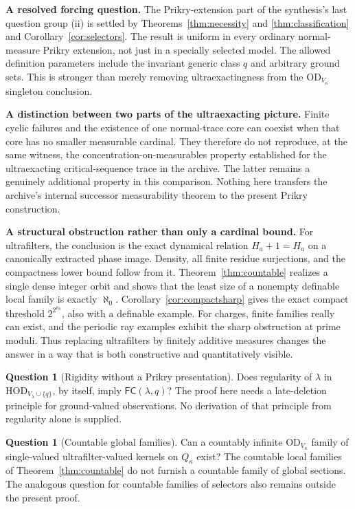 \documentclass[11pt,letterpaper]{article}
\theoremstyle{definition}
\newtheorem{question}[definition]{Question}
\numberwithin{equation}{section}
\newcommand{\HOD}{\mathrm{HOD}}
\newcommand{\OD}{\mathrm{OD}}
\newcommand{\Inv}{\mathsf{FC}}
\begin{document}
\textbf{A resolved forcing question.}
The Prikry-extension part of the synthesis's last question group (ii) is
settled by Theorems~\ref{thm:necessity} and \ref{thm:classification} and
Corollary~\ref{cor:selectors}. The result is uniform in every ordinary
normal-measure Prikry extension, not just in a specially selected model.
The allowed definition parameters include the invariant generic class
$q$ and arbitrary ground sets. This is stronger than merely removing
ultraexactingness from the $\OD_{V_\kappa}$ singleton conclusion.

\textbf{A distinction between two parts of the ultraexacting picture.}
Finite cyclic failures and the existence of one normal-trace core can
coexist when that core has no smaller measurable cardinal. They therefore
do not reproduce, at the same witness, the concentration-on-measurables
property established for the ultraexacting critical-sequence trace in the
archive. The latter remains a genuinely additional property in this
comparison. Nothing here transfers the archive's internal successor
measurability theorem to the present Prikry construction.

\textbf{A structural obstruction rather than only a cardinal bound.}
For ultrafilters, the conclusion is the exact dynamical relation
$H_a+1=H_a$ on a canonically extracted phase image. Density, all finite
residue surjections, and the compactness lower bound follow from it.
Theorem~\ref{thm:countable} realizes a single dense integer orbit and
shows that the least size of a nonempty definable local family is exactly
$\aleph_0$. Corollary~\ref{cor:compactsharp} gives the exact compact
threshold $2^{2^{\aleph_0}}$, also with a definable example.
For charges, finite families really can exist, and the periodic ray
examples exhibit the sharp obstruction at prime moduli. Thus replacing
ultrafilters by finitely additive measures changes the answer in a way
that is both constructive and quantitatively visible.

\begin{question}[Rigidity without a Prikry presentation]
Does regularity of $\lambda$ in $\HOD_{V_\lambda\cup\{q\}}$, by itself,
imply $\Inv(\lambda,q)$? The proof here needs a late-deletion principle
for ground-valued observations. No derivation of that principle from
regularity alone is supplied.
\end{question}

\begin{question}[Countable global families]
Can a countably infinite $\OD_{V_\kappa}$ family of single-valued
ultrafilter-valued kernels on $Q_\kappa$ exist? The countable local
families of Theorem~\ref{thm:countable} do not furnish a countable family
of global sections. The analogous question for countable families of
selectors also remains outside the present proof.
\end{question}
\end{document}
